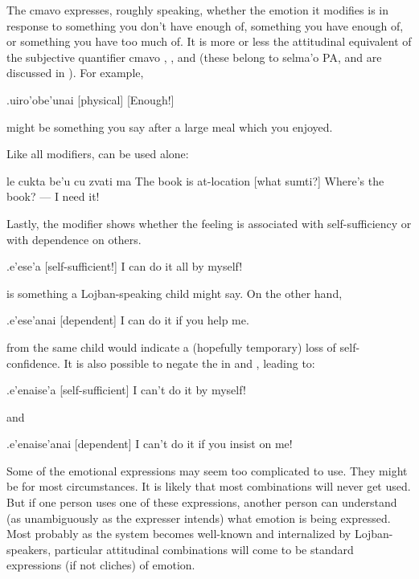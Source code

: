The cmavo  expresses, roughly speaking, whether the
    emotion it modifies is in response to something you don't have
    enough of, something you have enough of, or something you have
    too much of. It is more or less the attitudinal equivalent of
    the subjective quantifier cmavo , , and 
    (these belong to selma'o PA, and are discussed in ). For example,
\begin{example}
.uiro'obe'unai\n
{} [physical] [Enough!]
\end{example}

{\noindent}might be something you say after a large meal which you
    enjoyed. 

Like all modifiers,  can be used alone:
\begin{example}
le cukta be'u cu zvati ma\n
The book  is at-location [what sumti?]\n
Where's the book? --- I need it!
\end{example}

Lastly, the modifier  shows whether the feeling is
    associated with self-sufficiency or with dependence on others.
\begin{example}
.e'ese'a\n
{} [self-sufficient!]\n
I can do it all by myself!
\end{example}

{\noindent}is something a Lojban-speaking child might say. On the other
    hand,
\begin{example}
.e'ese'anai\n
{} [dependent]\n
I can do it if you help me.
\end{example}

{\noindent}from the same child would indicate a (hopefully temporary) loss
    of self- confidence. It is also possible to negate the 
    in  and , leading to:
\begin{example}
.e'enaise'a\n
{} [self-sufficient]\n
I can't do it by myself!
\end{example}

{\noindent}and
\begin{example}
.e'enaise'anai\n
{} [dependent]\n
I can't do it if you insist on  me!
\end{example}

Some of the emotional expressions may seem too complicated to
    use. They might be for most circumstances. It is likely that
    most combinations will never get used. But if one person uses
    one of these expressions, another person can understand (as
    unambiguously as the expresser intends) what emotion is being
    expressed. Most probably as the system becomes well-known and
    internalized by Lojban-speakers, particular attitudinal
    combinations will come to be standard expressions (if not
    cliches) of emotion.



